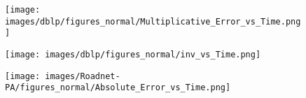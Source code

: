 \begin{figure*}[htbp]
\begin{subfigure}[b]{\textwidth}
\begin{minipage}[b]{0.3\textwidth}
	\end{minipage}%
	\begin{minipage}[b]{0.3\textwidth}
		\centering
		\texttt{[image: images/dblp/figures\_normal/Multiplicative\_Error\_vs\_Time.png]} %
		
	\end{minipage}%
	\begin{minipage}[b]{0.3\textwidth}
		\centering
		\texttt{[image: images/dblp/figures\_normal/inv\_vs\_Time.png]} %
	\end{minipage}
\end{subfigure}
\begin{subfigure}[b]{\textwidth}
	\centering
	\begin{minipage}[b]{0.05\textwidth}
		\centering
	\end{minipage}%
	\begin{minipage}[b]{0.3\textwidth}
		\centering
		\texttt{[image: images/Roadnet-PA/figures\_normal/Absolute\_Error\_vs\_Time.png]} %
		
	\end{minipage}%
	\begin{minipage}[b]{0.3\textwidth}
		\centering
		

\end{minipage}
\end{subfigure}
\end{figure*}
